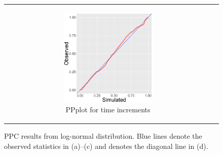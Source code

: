 \documentclass[ba]{imsart}
\numberwithin{equation}{section}
\theoremstyle{plain}
\begin{document}
\begin{figure}[!t]
\begin{tabular}[t]{cc}
\begin{subfigure}[b]{0.495\textwidth}
			\end{subfigure}
			\begin{subfigure}[b]{0.495\textwidth}
				\centering
				\caption{PPplot for time increments}
				\includegraphics[width=0.56\textwidth]{img/timePPplot-1.png}	
			\end{subfigure}
		\end{tabular}
		\caption {PPC results from log-normal distribution. Blue lines denote the observed statistics in (a)--(c) and denotes the diagonal line in (d).}
		\label{figure:PPCresults}
	\end{figure}
		
\end{document}
